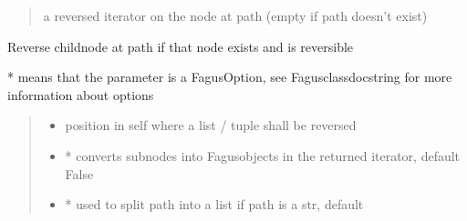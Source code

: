 \documentclass[a4paper,10pt,english]{sphinxmanual}
\begin{document}
\begin{fulllineitems}
\begin{fulllineitems}
\begin{quote}
\begin{description}
\begin{itemize}
\end{itemize}

\sphinxAtStartPar
a reversed iterator on the node at path (empty if path doesn’t exist)

\end{description}\end{quote}

\end{fulllineitems}


\begin{fulllineitems}
\label{\detokenize{fagus:fagus.Fagus.reverse}}
\pysigstartsignatures
{}
\pysigstopsignatures
\sphinxAtStartPar
Reverse child\sphinxhyphen{}node at path if that node exists and is reversible

\sphinxAtStartPar
* means that the parameter is a FagusOption, see Fagus\sphinxhyphen{}class\sphinxhyphen{}docstring for more information about options
\begin{quote}\begin{description}
\begin{itemize}
\item {}
\sphinxAtStartPar
{} \textendash{} position in self where a list / tuple shall be reversed

\item {}
\sphinxAtStartPar
{} \textendash{} * converts sub\sphinxhyphen{}nodes into Fagus\sphinxhyphen{}objects in the returned iterator, default False

\item {}
\sphinxAtStartPar
{} \textendash{} * used to split path into a list if path is a str, default 


\end{itemize}
\end{description}
\end{quote}
\end{fulllineitems}
\end{fulllineitems}
\end{document}
